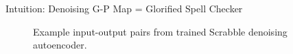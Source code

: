 %
%
%
%
%
%
%
%
%

\begin{frame}{Intuition: Denoising G-P Map = Glorified Spell Checker}

\begin{figure}

\centering \Huge


%
%
%
%


\vspace{1ex}

\caption{
Example input-output pairs from trained Scrabble denoising autoencoder.
}

\end{figure}

\end{frame}

